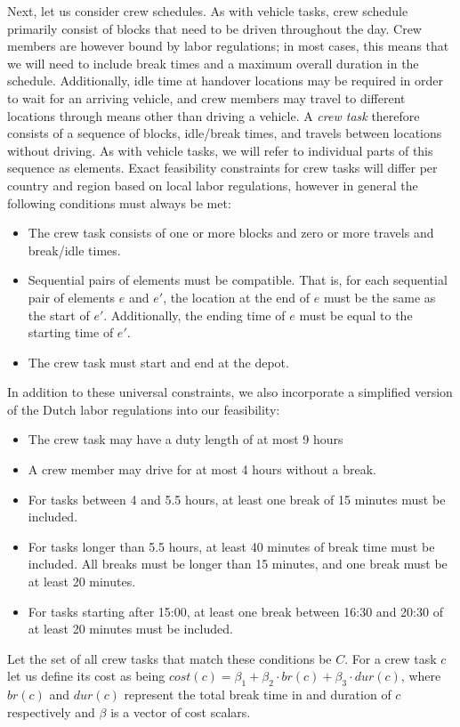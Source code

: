 \documentclass[]{article}
\begin{document}
Next, let us consider crew schedules. As with vehicle tasks, crew schedule primarily consist of blocks that need to be driven throughout the day. Crew members are however bound by labor regulations; in most cases, this means that we will need to include break times and a maximum overall duration in the schedule. Additionally, idle time at handover locations may be required in order to wait for an arriving vehicle, and crew members may travel to different locations through means other than driving a vehicle. A \textit{crew task} therefore consists of a sequence of blocks, idle/break times, and travels between locations without driving. As with vehicle tasks, we will refer to individual parts of this sequence as elements. Exact feasibility constraints for crew tasks will differ per country and region based on local labor regulations, however in general the following conditions must always be met: 
\begin{itemize}
  \item The crew task consists of one or more blocks and zero or more travels and break/idle times.
  \item Sequential pairs of elements must be compatible. That is, for each sequential pair of elements $e$ and $e'$, the location at the end of $e$ must be the same as the start of $e'$. Additionally, the ending time of $e$ must be equal to the starting time of $e'$. 
  \item The crew task must start and end at the depot.
\end{itemize}
In addition to these universal constraints, we also incorporate a simplified version of the Dutch labor regulations into our feasibility: 
\begin{itemize}
  \item The crew task may have a duty length of at most 9 hours 
  \item A crew member may drive for at most 4 hours without a break.
  \item For tasks between 4 and 5.5 hours, at least one break of 15 minutes must be included. 
  \item For tasks longer than 5.5 hours, at least 40 minutes of break time must be included. All breaks must be longer than 15 minutes, and one break must be at least 20 minutes.
  \item For tasks starting after 15:00, at least one break between 16:30 and 20:30 of at least 20 minutes must be included. 
\end{itemize}
Let the set of all crew tasks that match these conditions be $C$. For a crew task $c$ let us define its cost as being $cost(c) = \beta_1 + \beta_2 \cdot br(c) + \beta_3 \cdot dur(c)$, where $br(c)$ and $dur(c)$ represent the total break time in and duration of $c$ respectively and $\beta$ is a vector of cost scalars. \\
\end{document}
